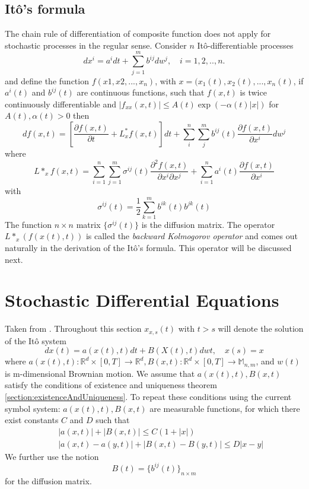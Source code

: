 \documentclass[12pt]{book}
\begin{document}
\subsection{It\^{o}'s formula}\label{subsection:itosFormula}
The chain rule of differentiation of composite function does not apply for stochastic processes in the regular sense. Consider $n$  It\^{o}-differentiable processes 
\begin{equation*}
dx^i = a^i dt+\sum_{j=1}^m b^{ij}dw^j, \quad i=1,2,..,n.
\end{equation*} 
and define the function $f(x1,x2,...,x_n)$, with $x=(x_1(t),x_2(t),...,x_n(t)$,
if $a^i(t)$ and $b^{ij}(t)$ are continuous functions, such that $f(x,t)$ is twice continuously differentiable and $|f_{xx}(x,t)|\leq A(t)\exp(-\alpha(t)|x|)$ for $A(t),\alpha(t)>0$ then
\begin{equation*}\label{eq:itoFormula}
df(x,t) = \left[\frac{\partial f(x,t)}{\partial t}+L^*_xf(x,t) \right]dt+\sum_{i}^n \sum_j^m b^{ij}(t)\frac{\partial f(x,t)}{\partial x^i}dw^j
\end{equation*}
where 
\begin{equation*}
L*_xf(x,t)=\sum_{i=1}^n\sum_{j=1}^m\sigma^{ij}(t)\frac{\partial^2f(x,t)}{\partial x^i \partial x^j}+\sum_{i=1}^n a^i(t)\frac{\partial f(x,t)}{\partial x^i}
\end{equation*}
with 
\begin{equation*}
\sigma^{ij}(t)=\frac{1}{2}\sum_{k=1}^m b^{ik}(t)b^{jk}(t)
\end{equation*}
The function $n\times n$ matrix $\{\sigma^{ij}(t) \}$ is the diffusion matrix. 
The operator $L*_x(f(x(t),t))$ is called the \textit{backward Kolmogorov operator} and comes out naturally in the derivation of the It\^{o}'s formula. This operator will be discussed next. 

\section{Stochastic Differential Equations}\label{section:stochasticDifferentialEquations}
Taken from \cite{schuss2009theory}. Throughout this section $x_{x,s}(t)$ with $t>s$ will denote the solution of the It\^{o} system 
\begin{equation}\label{Eq:ItoSystem}
	dx(t)= a(x(t),t)dt+B(X(t),t)dwt,\quad x(s)=x
\end{equation}
where $a(x(t),t):\mathbb{R}^d\times [0,T] \rightarrow \mathbb{R}^d, B(x,t):\mathbb{R}^d\times[0,T]\rightarrow\mathbb{M}_{n,m}$, and $w(t)$ is m-dimensional Brownian motion. 
We assume that $a(x(t),t), B(x,t)$ satisfy the conditions of existence and uniqueness theorem \ref{section:existenceAndUniqueness}. To repeat these conditions using the current symbol system:
$a(x(t),t), B(x,t)$ are measurable functions, for which there exist constants $C$ and $D$ such that 
\begin{eqnarray*}
	& &|a(x,t)|+|B(x,t)|\leq C(1+|x|)\\
	& &|a(x,t)-a(y,t)|+|B(x,t)-B(y,t)|\leq D|x-y|
\end{eqnarray*}
We further use the notion
\begin{equation*}
	B(t) = \{b^{ij}(t)\}_{n\times m}
\end{equation*}
for the diffusion matrix.
\end{document}
